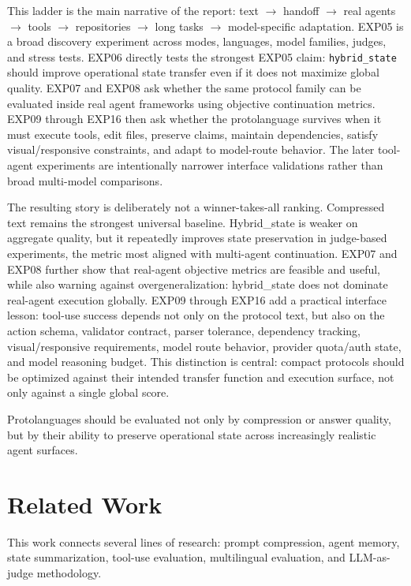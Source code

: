\documentclass[11pt]{article}
\begin{document}
This ladder is the main narrative of the report: text $\rightarrow$ handoff $\rightarrow$ real agents $\rightarrow$ tools $\rightarrow$ repositories $\rightarrow$ long tasks $\rightarrow$ model-specific adaptation. EXP05 is a broad discovery experiment across modes, languages, model families, judges, and stress tests. EXP06 directly tests the strongest EXP05 claim: \texttt{hybrid\_state} should improve operational state transfer even if it does not maximize global quality. EXP07 and EXP08 ask whether the same protocol family can be evaluated inside real agent frameworks using objective continuation metrics. EXP09 through EXP16 then ask whether the protolanguage survives when it must execute tools, edit files, preserve claims, maintain dependencies, satisfy visual/responsive constraints, and adapt to model-route behavior. The later tool-agent experiments are intentionally narrower interface validations rather than broad multi-model comparisons.

The resulting story is deliberately not a winner-takes-all ranking. Compressed text remains the strongest universal baseline. Hybrid\_state is weaker on aggregate quality, but it repeatedly improves state preservation in judge-based experiments, the metric most aligned with multi-agent continuation. EXP07 and EXP08 further show that real-agent objective metrics are feasible and useful, while also warning against overgeneralization: hybrid\_state does not dominate real-agent execution globally. EXP09 through EXP16 add a practical interface lesson: tool-use success depends not only on the protocol text, but also on the action schema, validator contract, parser tolerance, dependency tracking, visual/responsive requirements, model route behavior, provider quota/auth state, and model reasoning budget. This distinction is central: compact protocols should be optimized against their intended transfer function and execution surface, not only against a single global score.

Protolanguages should be evaluated not only by compression or answer quality, but by their ability to preserve operational state across increasingly realistic agent surfaces.

\section{Related Work}
This work connects several lines of research: prompt compression, agent memory, state summarization, tool-use evaluation, multilingual evaluation, and LLM-as-judge methodology.
\end{document}
